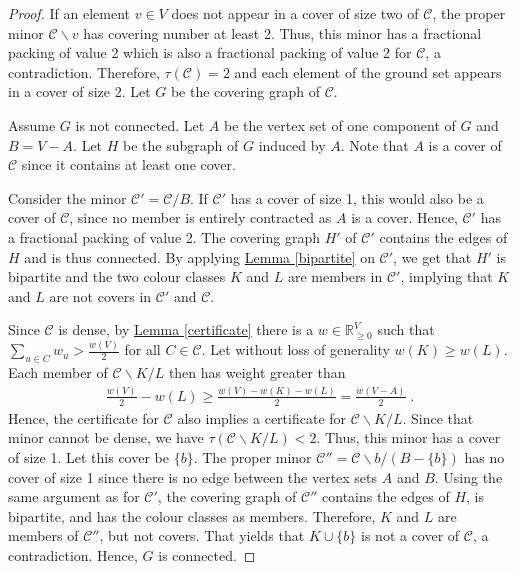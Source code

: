 \documentclass[a4paper, 12pt]{scrbook}
\theoremstyle{definition}
\newcommand*{\IR}{\ensuremath{\mathbb{R}}}
\begin{document}
   \begin{proof}
       If an element $v \in V$ does not appear in a cover of size two of $\mathcal{C}$, the proper minor $\mathcal{C} \backslash v$ has covering number at least 2.
       Thus, this minor has a fractional packing of value 2 which is also a fractional packing of value 2 for $\mathcal{C}$, a contradiction.
       Therefore, $\tau(\mathcal{C}) = 2$ and each element of the ground set appears in a cover of size 2.
       Let $G$ be the covering graph of $\mathcal{C}$.

       Assume $G$ is not connected.
       Let $A$ be the vertex set of one component of $G$ and $B = V - A$.
       Let $H$ be the subgraph of $G$ induced by $A$.
       Note that $A$ is a cover of $\mathcal{C}$ since it contains at least one cover.

       Consider the minor $\mathcal{C'}=\mathcal{C}/B$.
       If $\mathcal{C'}$ has a cover of size 1, this would also be a cover of $\mathcal{C}$, since no member is entirely contracted as $A$ is a cover.
       Hence, $\mathcal{C'}$ has a fractional packing of value 2.
       The covering graph $H'$ of $\mathcal{C'}$ contains the edges of $H$ and is thus connected.
       By applying \hyperref[bipartite]{Lemma \ref*{bipartite}} on $\mathcal{C'}$, we get that $H'$ is bipartite and the two colour classes $K$ and $L$ are members in $\mathcal{C'}$, implying that $K$ and $L$ are not covers in $\mathcal{C'}$ and $\mathcal{C}$.

       Since $\mathcal{C}$ is dense, by \hyperref[certificate]{Lemma \ref*{certificate}} there is a $w \in \IR^V_{\geq 0}$ such that $\sum_{u\in C} w_u > \frac{w(V)}{2}$ for all $C \in \mathcal{C}$.
       Let without loss of generality $w(K) \geq w(L)$.
       Each member of $\mathcal{C} \backslash K / L$ then has weight greater than
       \begin{align*}
           \frac{w(V)}{2} - w(L) \geq \frac{w(V)-w(K)-w(L)}{2} = \frac{w(V-A)}{2} \;.
       \end{align*}
       Hence, the certificate for $\mathcal{C}$ also implies a certificate for $\mathcal{C}\backslash K /L$.
       Since that minor cannot be dense, we have $\tau(\mathcal{C}\backslash K /L)<2$.
       Thus, this minor has a cover of size 1.
       Let this cover be $\{b\}$.
       The proper minor $\mathcal{C''}=\mathcal{C} \backslash b / (B-\{b\})$ has no cover of size 1 since there is no edge between the vertex sets $A$ and $B$.
       Using the same argument as for $\mathcal{C'}$, the covering graph of $\mathcal{C''}$ contains the edges of $H$, is bipartite, and has the colour classes as members.
       Therefore, $K$ and $L$ are members of $\mathcal{C''}$, but not covers.
       That yields that $K \cup \{b\}$ is not a cover of $\mathcal{C}$, a contradiction.
       Hence, $G$ is connected.
   \end{proof}
\end{document}
